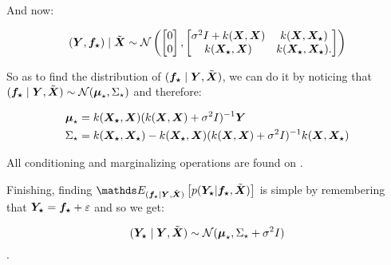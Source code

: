     And now:

    $$(\bfY, \fst)\mid\tbX \sim \cN \left( 
    \begin{bmatrix}
        0\\0
    \end{bmatrix},
    \begin{bmatrix}
        \sigma^2I + k(\bfX, \bfX) & k(\bfX, \Xst)\\
        k(\Xst, \bfX) & k(\Xst, \Xst).\\
    \end{bmatrix}
    \right)$$

    So as to find the distribution of $(\fst\mid\bfY, \tbX)$, we can do it by noticing that  $(\fst\mid\bfY,\tbX) \sim \cN (\bfmu_\star, \Sigma_\star)$ and therefore:

    \begin{align*}
        \bfmu_\star &= k(\Xst, \bfX)(k(\bfX, \bfX) + \sigma^2I)^{-1}\bfY\\
        \Sigma_\star &= k(\Xst, \Xst) - k(\Xst, \bfX)(k(\bfX, \bfX) + \sigma^2I)^{-1}k(\bfX, \Xst)
    \end{align*}

    All conditioning and marginalizing operations are found on \cite{Petersen2008}.

    Finishing, finding 
    $\bE_{(\fst\mid\bfY,\tbX)}\left[p(\Yst| \fst, \tbX)\right]$ is simple by remembering that $\Yst = \fst + \epsilon$ and so we get:

    $$(\Yst \mid \bfY, \tbX) \sim \cN(\bfmu_\star, \Sigma_\star + \sigma^2I)$$.

